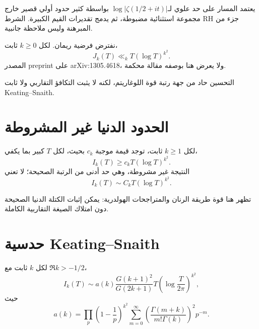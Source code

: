 يعتمد المسار على حد علوي لـ\(\log|\zeta(1/2+it)|\) بواسطة كثير حدود أولي قصير خارج مجموعة استثنائية مضبوطة، ثم يدمج تقديرات القيم الكبيرة. الشرط RH جزء من المبرهنة وليس ملاحظة جانبية.

\begin{theorem}
\label{thm:ch22-harper}
نفترض فرضية ريمان. لكل \(k\ge0\) ثابت،
\[
J_k(T)\ll_k T(\log T)^{k^2}.
\]
المصدر \textenglish{preprint} على \textenglish{arXiv:1305.4618}، ولا يعرض هنا بوصفه مقالة محكمة.
\end{theorem}

التحسين حاد من جهة رتبة قوة اللوغاريتم، لكنه لا يثبت التكافؤ التقاربي ولا ثابت Keating--Snaith.

\section{الحدود الدنيا غير المشروطة}

\begin{theorem}
\label{thm:ch22-lower-bounds}
لكل \(k\ge1\) ثابت، توجد قيمة موجبة \(c_k\) بحيث، لكل \(T\) كبير بما يكفي،
\[
I_k(T)\ge c_k T(\log T)^{k^2}.
\]
النتيجة غير مشروطة، وهي حد أدنى من الرتبة الصحيحة؛ لا تعني
\[
I_k(T)\sim C_kT(\log T)^{k^2}.
\]
\end{theorem}

تظهر هنا قوة طريقة الرنان والمتراجحات الهولدرية: يمكن إثبات الكتلة الدنيا الصحيحة دون امتلاك الصيغة التقاربية الكاملة.

\section{حدسية Keating--Snaith}

\begin{conjecture}
\label{conj:ch22-keating-snaith}
لكل \(k\) ثابت مع \(\Re k>-1/2\)،
\[
I_k(T)
\sim
a(k)\frac{G(k+1)^2}{G(2k+1)}
T\left(\log\frac{T}{2\pi}\right)^{k^2},
\]
حيث
\[
a(k)=\prod_p\left(1-\frac1p\right)^{k^2}
\sum_{m=0}^{\infty}
\left(\frac{\Gamma(m+k)}{m!\Gamma(k)}\right)^2p^{-m}.
\]
\end{conjecture}

